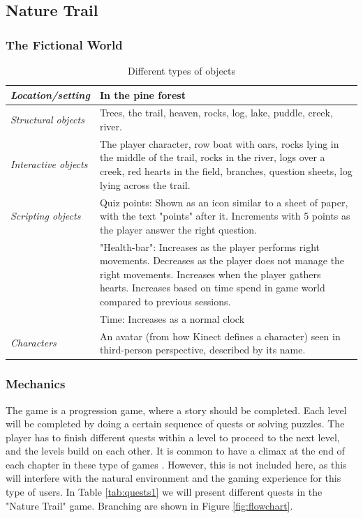 \subsection{Nature Trail}

\subsubsection{The Fictional World} 

\begin{table} [H]
\centering
\begin{tabular}{|p{}|p{}|}
\hline
\emph{Location/setting} & In the pine forest  \\ \hline
\emph{Structural objects} & Trees, the trail, heaven, rocks, log, lake, puddle, creek, river.  \\ \hline
\emph{Interactive objects} & The player character, row boat with oars, rocks lying in the middle of the trail, rocks in the river, logs over a creek, red hearts in the field, branches, question sheets, log lying across the trail. \\ \hline
\emph{Scripting objects} & Quiz points: Shown as an icon similar to a sheet of paper, with the text "points" after it. Increments with 5 points as the player answer the right question.\\ \hline
	     & "Health-bar": Increases as the player performs right movements. Decreases as the player does not manage the right movements. Increases when the player gathers hearts. Increases based on time spend in game world compared to previous sessions. 
	      \\ \hline
	       & Time: Increases as a normal clock \\ \hline
\emph{Characters} & An avatar (from how Kinect defines a character) seen in third-person perspective, described by its name. \\ \hline
    \end{tabular}
    \caption[Various objects in the "Nature Trail"]{Different types of objects}
    \label{tab:objects1}
\end{table}  

\subsubsection{Mechanics} 

The game is a progression game, where a story should be completed. Each level will be completed by doing a certain sequence of quests or solving puzzles. The player has to finish different quests within a level to proceed to the next level, and the levels build on each other. It is common to have a climax at the end of each chapter in these type of games \cite{understandingvg}. However, this is not included here, as this will interfere with the natural environment and the gaming experience for this type of users. In Table \ref{tab:quests1} we will present different quests in the "Nature Trail" game. Branching are shown in Figure \ref{fig:flowchart}.
  

